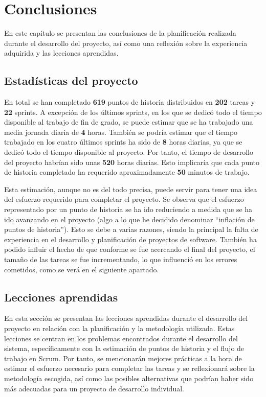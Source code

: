 \chapter{Conclusiones}
\label{anexo3:cap:conclusiones}
En este capítulo se presentan las conclusiones de la planificación realizada durante el desarrollo
del proyecto, así como una reflexión sobre la experiencia adquirida y las lecciones aprendidas.

\section{Estadísticas del proyecto}
\label{anexo3:sec:estadisticas}
En total se han completado \textbf{619} puntos de historia distribuidos en \textbf{202} tareas
y \textbf{22} sprints. A excepción de los últimos sprints, en los que se dedicó todo el tiempo
disponible al trabajo de fin de grado, se puede estimar que se ha trabajado una media
jornada diaria de \textbf{4} horas. También se podría estimar que el tiempo trabajado en los cuatro
últimos sprints ha sido de \textbf{8} horas diarias, ya que se dedicó todo el tiempo disponible
al proyecto. Por tanto, el tiempo de desarrollo del proyecto habrían sido unas \textbf{520} horas
diarias. Esto implicaría que cada punto de historia completado ha requerido aproximadamente
\textbf{50} minutos de trabajo.

Esta estimación, aunque no es del todo precisa, puede servir para tener una idea del esfuerzo
requerido para completar el proyecto. Se observa que el esfuerzo representado por un punto de historia
se ha ido reduciendo a medida que se ha ido avanzando en el proyecto (algo a lo que he decidido
denominar \enquote{inflación de puntos de historia}). Esto se debe a varias razones, siendo la principal
la falta de experiencia en el desarrollo y planificación de proyectos de software. También ha
podido influir el hecho de que conforme se fue acercando el final del proyecto, el tamaño de las
tareas se fue incrementando, lo que influenció en los errores cometidos, como se verá en el
siguiente apartado.

\section{Lecciones aprendidas}
\label{anexo3:sec:lecciones-aprendidas}
En esta sección se presentan las lecciones aprendidas durante el desarrollo del proyecto en relación
con la planificación y la metodología utilizada. Estas lecciones se centran en los problemas
encontrados durante el desarrollo del sistema, específicamente con la estimación de puntos de
historia y el flujo de trabajo en Scrum. Por tanto, se mencionarán mejores prácticas a la hora
de estimar el esfuerzo necesario para completar las tareas y se reflexionará sobre la metodología
escogida, así como las posibles alternativas que podrían haber sido más adecuadas para un proyecto
de desarrollo individual.

